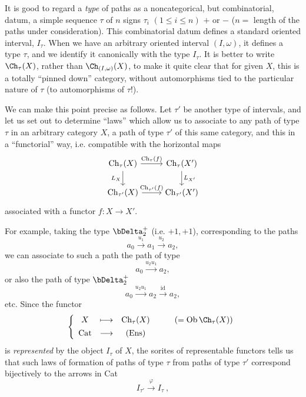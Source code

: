 

It is good to regard a \textit{type} of paths as a noncategorical, but combinatorial, datum, a simple sequence $\tau$ of $n$ signs $\tau_i$ $(1 \leq i \leq n)$ $+$ or $-$ ($n =$ length of the paths under consideration). This combinatorial datum defines a standard oriented interval, $I_\tau$. When we have an arbitrary oriented interval $(I,\omega)$, it defines a type $\tau$, and we identify it canonically with the type $I_\tau$. It is better to write $\Ch_\tau(X)$, rather than $\Ch_{(I,\omega)}(X)$, to make it quite clear that for given $X$, this is a totally ``pinned down'' category, without automorphisms tied to the particular nature of $\tau$ (to automorphisms of $\tau$!). %

We can make this point precise as follows. Let $\tau'$ be another type of intervals, and let us set out to determine ``laws'' which allow us to associate to any path of type $\tau$ in an arbitrary category $X$, a path of type $\tau'$ of this same category, and this in a ``functorial'' way, i.e. compatible with the horizontal maps
\[
\begin{tikzcd}
\mathrm{Ch}_\tau(X) \arrow[r, "\mathrm{Ch}_\tau(f)"] \arrow[d, "L_X"'] & \mathrm{Ch}_\tau(X') \arrow[d, "L_{X'}"] \\
\mathrm{Ch}_{\tau'}(X) \arrow[r, "\mathrm{Ch}_{\tau'}(f)"] & \mathrm{Ch}_{\tau'}(X')
\end{tikzcd}
\]
associated with a functor $f : X \longrightarrow X'$.


For example, taking the type $\bDelta_2^+$ (i.e. $+1,+1$), corresponding to the paths
\[
a_0 \xrightarrow{u_1} a_1 \xrightarrow{u_2} a_2,
\]
we can associate to such a path the path of type 
\[
a_0 \xrightarrow{u_2u_1} a_2,
\]
or also the path of type $\bDelta_2^+$
\[
a_0 \xrightarrow{u_2u_1} a_2 \xrightarrow{\mathrm{id}} a_2,
\]
etc. Since the functor
\[
\left\{
\begin{array}{cccl}
X & \longmapsto & \mathrm{Ch}_\tau(X) & \qquad (= \mathrm{Ob}\, \Ch_\tau(X)) \\[1ex]
\mathrm{Cat} & \longrightarrow & (\mathrm{Ens}) &
\end{array}
\right.
\]
is \textit{represented} by the object $I_\tau$ of $X$, the sorites of representable functors tells us that such laws of formation of paths of type $\tau$ from paths of type $\tau'$ correspond bijectively to the arrows in Cat
\[
I_{\tau'} \xrightarrow{\varphi} I_\tau\ ,
\]